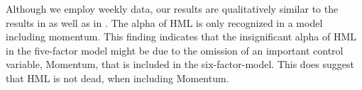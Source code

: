 Although we employ weekly data, our results are qualitatively similar to the results in \textcite{FF2015} as well as in \textcite{Asness2015}. The alpha of HML is only recognized in a model including momentum. This finding indicates that the insignificant alpha of HML in the five-factor model might be due to the omission of an important control variable, Momentum, that is included in the six-factor-model. This does suggest that HML is not dead, when including Momentum.


